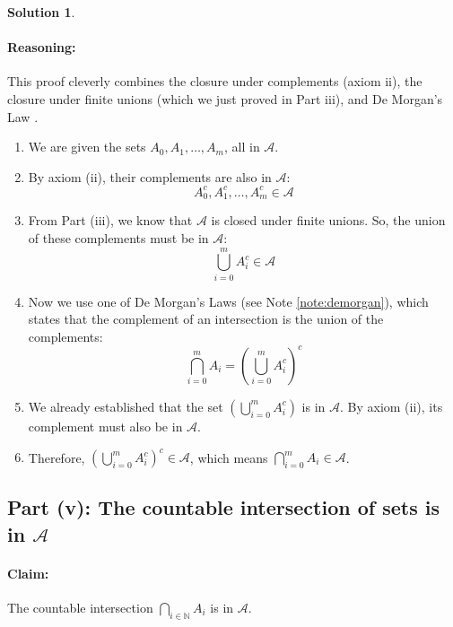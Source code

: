 \documentclass[11pt,a4paper]{article}
\theoremstyle{definition}
\newtheorem*{solution}{Solution}
\begin{document}
\begin{solution}
\paragraph{Reasoning:}
This proof cleverly combines the closure under complements (axiom ii), the closure under finite unions (which we just proved in Part iii), and De Morgan's Law \cite[Lemma 1.2]{script}.
\begin{enumerate}
    \item We are given the sets $A_0, A_1, \dots, A_m$, all in $\mathcal{A}$.
    \item By axiom (ii), their complements are also in $\mathcal{A}$:
    \[ A_0^c, A_1^c, \dots, A_m^c \in \mathcal{A} \]
    \item From Part (iii), we know that $\mathcal{A}$ is closed under finite unions. So, the union of these complements must be in $\mathcal{A}$:
    \[ \bigcup_{i=0}^{m} A_i^c \in \mathcal{A} \]
    \item Now we use one of De Morgan's Laws (see Note \ref{note:demorgan}), which states that the complement of an intersection is the union of the complements:
    \[ \bigcap_{i=0}^{m} A_i = \left( \bigcup_{i=0}^{m} A_i^c \right)^c \]
    \item We already established that the set $\left( \bigcup_{i=0}^{m} A_i^c \right)$ is in $\mathcal{A}$. By axiom (ii), its complement must also be in $\mathcal{A}$.
    \item Therefore, $\left( \bigcup_{i=0}^{m} A_i^c \right)^c \in \mathcal{A}$, which means $\bigcap_{i=0}^{m} A_i \in \mathcal{A}$.
\end{enumerate}

\subsection*{Part (v): The countable intersection of sets is in $\mathcal{A}$}

\paragraph{Claim:} The countable intersection $\bigcap_{i \in \mathbb{N}} A_i$ is in $\mathcal{A}$.


\end{solution}
\end{document}
